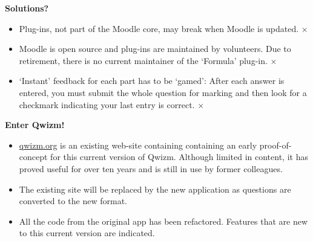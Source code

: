 \documentclass[11pt,xcolor={svgnames, x11names}]{beamer}
\begin{document}
\begin{frame}{\bf Solutions?}
{\begin{textblock*}{0.95\textwidth}
\begin{itemize}
\begin{itemize}
						\item<4| alert@4> Plug-ins, not part of the Moodle core, may break when Moodle is updated. \textcolor{saitMaroon}{\large $\bm  \times $}
						\item<4| alert@4> Moodle is open source and plug-ins are maintained by volunteers. Due to retirement, there is no current maintainer of the `Formula' plug-in. \textcolor{saitMaroon}{\large $\bm  \times $}
						\item<4|alert@4> 	`Instant' feedback for each part has to be `gamed': After each answer is entered, you must submit the whole question for marking and then look for a checkmark indicating your last entry is correct. \textcolor{saitMaroon}{\large $\bm  \times $}
					\end{itemize} 
			\end{itemize}
		\end{textblock*}
	}	
\end{frame}	

\begin{frame}{\bf Enter Qwizm!}
	\begin{itemize}
		\item \url{qwizm.org} is an existing web-site containing containing an early proof-of-concept for this current version of Qwizm. Although limited in content, it has proved useful for over ten years and is still in use by former colleagues.
		\item The existing site will be replaced by the new application as questions are converted to the new format.
		\item All the code from the original app has been refactored. Features that are new to this current version are indicated. 
	\end{itemize}

\end{frame}	
\end{document}
